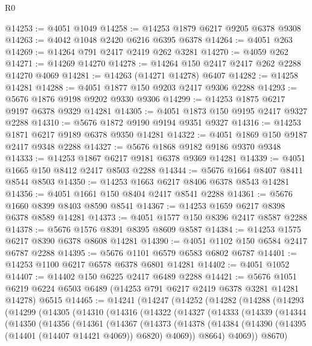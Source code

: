 \begin{lexlean}{R0}
\begin{coremodule}
@14253 := @4051 @1049
@14258 := @14253 @1879 @6217 @9205 @6378 @9308
@14263 := @4042 @1048 @2420 @6216 @6395 @6378
@14264 := @4051 @263
@14269 := @14264 @791 @2417 @2419 @262 @3281
@14270 := @4059 @262
@14271 := @14269 @14270
@14278 := @14264 @150 @2417 @2417 @262 @2288 @14270 @4069
@14281 := @14263 (@14271 @14278) @6407
@14282 := @14258 @14281
@14288 := @4051 @1877 @150 @9203 @2417 @9306 @2288
@14293 := @5676 @1876 @9198 @9202 @9330 @9306
@14299 := @14253 @1875 @6217 @9197 @6378 @9329 @14281
@14305 := @4051 @1873 @150 @9195 @2417 @9327 @2288
@14310 := @5676 @1872 @9190 @9194 @9351 @9327
@14316 := @14253 @1871 @6217 @9189 @6378 @9350 @14281
@14322 := @4051 @1869 @150 @9187 @2417 @9348 @2288
@14327 := @5676 @1868 @9182 @9186 @9370 @9348
@14333 := @14253 @1867 @6217 @9181 @6378 @9369 @14281
@14339 := @4051 @1665 @150 @8412 @2417 @8503 @2288
@14344 := @5676 @1664 @8407 @8411 @8544 @8503
@14350 := @14253 @1663 @6217 @8406 @6378 @8543 @14281
@14356 := @4051 @1661 @150 @8404 @2417 @8541 @2288
@14361 := @5676 @1660 @8399 @8403 @8590 @8541
@14367 := @14253 @1659 @6217 @8398 @6378 @8589 @14281
@14373 := @4051 @1577 @150 @8396 @2417 @8587 @2288
@14378 := @5676 @1576 @8391 @8395 @8609 @8587
@14384 := @14253 @1575 @6217 @8390 @6378 @8608 @14281
@14390 := @4051 @1102 @150 @6584 @2417 @6787 @2288
@14395 := @5676 @1101 @6579 @6583 @6802 @6787
@14401 := @14253 @1100 @6217 @6578 @6378 @6801 @14281
@14402 := @4051 @1052
@14407 := @14402 @150 @6225 @2417 @6489 @2288
@14421 := @5676
    @1051
    @6219
    @6224
    @6503
    @6489
    (@14253 @791 @6217 @2419 @6378 @3281 @14281 @14278)
    @6515
@14465 := @14241
    (@14247
      (@14252
        (@14282
          (@14288
            (@14293
              (@14299
                (@14305
                  (@14310
                    (@14316
                      (@14322
                        (@14327
                          (@14333
                            (@14339
                              (@14344
                                (@14350
                                  (@14356
                                    (@14361
                                      (@14367
                                        (@14373
                                          (@14378
                                            (@14384
                                              (@14390
                                                (@14395 (@14401 (@14407 @14421 @4069)) @6820)
                                                @4069))
                                            @8664)
                                          @4069))
                                      @8670)

\end{coremodule}
\end{lexlean}
